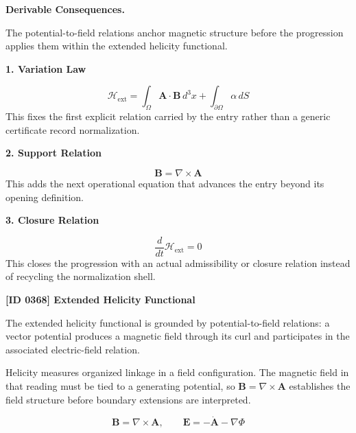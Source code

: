 \par\vspace{0.35em}
\noindent\textbf{Derivable Consequences.}\quad
\begingroup
\footnotesize
\raggedright
The potential-to-field relations anchor magnetic structure before the progression applies them within the extended helicity functional.
\par\endgroup

\noindent\textbf{1. Variation Law}\par
\[
\mathcal{H}_{\mathrm{ext}}=\int_{\Omega}\mathbf{A}\cdot\mathbf{B}\,d^{3}x+\int_{\partial\Omega}\alpha\,dS
\]
\noindent This fixes the first explicit relation carried by the entry rather than a generic certificate record normalization.\par
\noindent\textbf{2. Support Relation}\par
\[
\mathbf{B}=\nabla\times\mathbf{A}
\]
\noindent This adds the next operational equation that advances the entry beyond its opening definition.\par
\noindent\textbf{3. Closure Relation}\par
\[
\frac{d}{dt}\mathcal{H}_{\mathrm{ext}}=0
\]
\noindent This closes the progression with an actual admissibility or closure relation instead of recycling the normalization shell.\par

\clearpage
\noindent\textbf{[ID 0368] Extended Helicity Functional}\par
\vspace{0.35em}
\begingroup\small


The extended helicity functional is grounded by potential-to-field relations: a vector potential produces a magnetic field through its curl and participates in the associated electric-field relation.


Helicity measures organized linkage in a field configuration. The magnetic field in that reading must be tied to a generating potential, so \(\mathbf{B}=\nabla\times\mathbf{A}\) establishes the field structure before boundary extensions are interpreted.


\[
\mathbf{B}=\nabla\times\mathbf{A}, \qquad \mathbf{E}=-\dot{\mathbf{A}}-\nabla\Phi
\]


